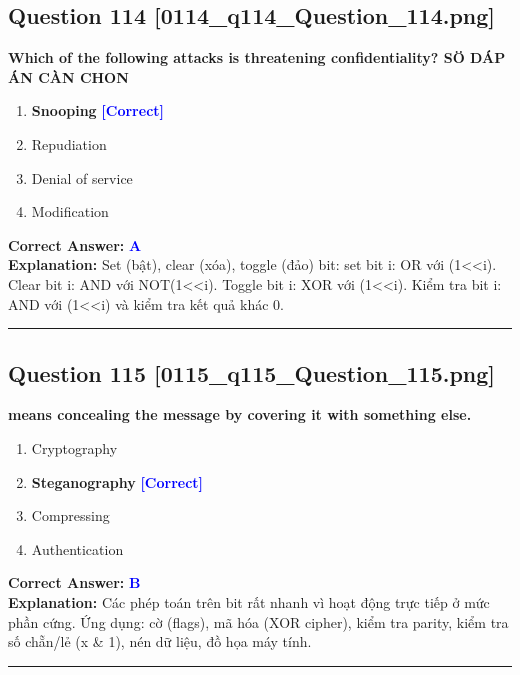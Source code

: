 \documentclass[11pt,a4paper]{article}
\begin{document}
\begin{minipage}{\textwidth}
\subsection*{Question 114 \quad \footnotesize{[0114\_q114\_Question\_114.png]}}
\noindent \textbf{Which of the following attacks is threatening confidentiality? SÖ DÁP ÁN CÀN CHON}

\begin{enumerate}[label=\Alph*.]
    \item \textbf{Snooping} \hfill \textcolor{blue}{\textbf{[Correct]}}
    \item Repudiation
    \item Denial of service
    \item Modification
\end{enumerate}

\noindent \textbf{Correct Answer:} \textcolor{blue}{\textbf{A}} \\[2pt]
\noindent \textbf{Explanation:} Set (bật), clear (xóa), toggle (đảo) bit: set bit i: OR với (1<<i). Clear bit i: AND với NOT(1<<i). Toggle bit i: XOR với (1<<i). Kiểm tra bit i: AND với (1<<i) và kiểm tra kết quả khác 0.

\par\vspace{0.3cm}
\hrule
\vspace{0.3cm}
\end{minipage}

\begin{minipage}{\textwidth}
\subsection*{Question 115 \quad \footnotesize{[0115\_q115\_Question\_115.png]}}
\noindent \textbf{means concealing the message by covering it with something else.}

\begin{enumerate}[label=\Alph*.]
    \item Cryptography
    \item \textbf{Steganography} \hfill \textcolor{blue}{\textbf{[Correct]}}
    \item Compressing
    \item Authentication
\end{enumerate}

\noindent \textbf{Correct Answer:} \textcolor{blue}{\textbf{B}} \\[2pt]
\noindent \textbf{Explanation:} Các phép toán trên bit rất nhanh vì hoạt động trực tiếp ở mức phần cứng. Ứng dụng: cờ (flags), mã hóa (XOR cipher), kiểm tra parity, kiểm tra số chẵn/lẻ (x \& 1), nén dữ liệu, đồ họa máy tính.

\par\vspace{0.3cm}
\hrule
\vspace{0.3cm}
\end{minipage}
\end{document}
